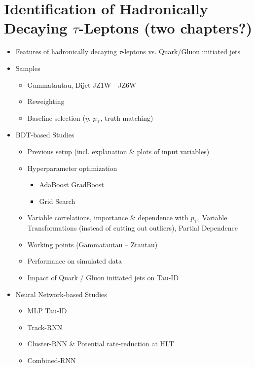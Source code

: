 \section{Identification of Hadronically Decaying $\tau$-Leptons (two chapters?)}

\begin{itemize}
\item Features of hadronically decaying $\tau$-leptons vs. Quark/Gluon
  initiated jets

\item Samples
  \begin{itemize}
  \item Gammatautau, Dijet JZ1W - JZ6W
  \item Reweighting
  \item Baseline selection ($\eta$, $p_\mathrm{T}$, truth-matching)
  \end{itemize}

\item BDT-based Studies
  \begin{itemize}
  \item Previous setup (incl. explanation \& plots of input variables)
  \item Hyperparameter optimization
    \begin{itemize}
    \item AdaBoost \textrightarrow GradBoost
    \item Grid Search
    \end{itemize}
  \item Variable correlations, importance \& dependence with $p_\mathrm{T}$,
    Variable Transformations (instead of cutting out outliers), Partial
    Dependence
  \item Working points (Gammatautau -- Ztautau)
  \item Performance on simulated data
  \item Impact of Quark / Gluon initiated jets on Tau-ID
  \end{itemize}

\item Neural Network-based Studies
  \begin{itemize}
  \item MLP Tau-ID
  \item Track-RNN
  \item Cluster-RNN \& Potential rate-reduction at HLT
  \item Combined-RNN
  \end{itemize}

\end{itemize}

